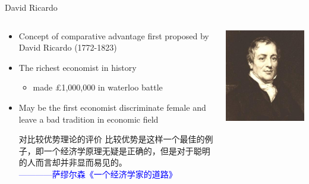 \documentclass[10pt,hyperref={CJKbookmarks=true},xcolor=dvipsnames,aspectratio=169]{beamer}
\begin{document}
\begin{frame}{David Ricardo }




\begin{columns}[onlytextwidth]
\begin{column}{0.6\textwidth}
\begin{itemize}
\item Concept of comparative advantage first proposed by David Ricardo (1772-1823) 
\item The richest economist in history

\begin{itemize}
\item made £1,000,000 in waterloo battle
\end{itemize}
\item May be the first economist discriminate female and leave a bad tradition
in economic field
\begin{block}{对比较优势理论的评价}
	比较优势是这样一个最佳的例子，即一个经济学原理无疑是正确的，但是对于聪明的人而言却并非显而易见的。\\
		\textcolor{blue}{————萨缪尔森《一个经济学家的道路》}
\end{block}
\end{itemize}

\end{column}
\begin{column}{0.4\textwidth}
\includegraphics[scale=0.5]{fig/ricardo/lec3-03}
\end{column}
\end{columns}




\end{frame}
\end{document}
